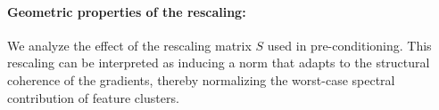     
    
    
    

\paragraph{Geometric properties of the \turbomuon rescaling:}
We analyze the effect of the rescaling matrix $S$ used in \turbomuon pre-conditioning. This rescaling can be interpreted as inducing a norm that adapts to the structural coherence of the gradients, thereby normalizing the worst-case spectral contribution of feature clusters.


